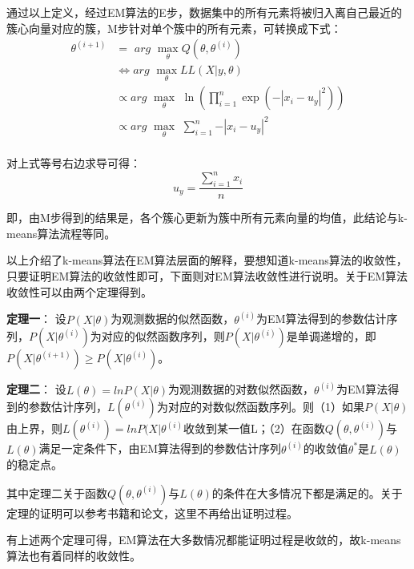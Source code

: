 通过以上定义，经过EM算法的E步，数据集中的所有元素将被归入离自己最近的簇心向量对应的簇，M步针对单个簇中的所有元素，可转换成下式：
$$\begin{aligned}
	\theta ^{\left( i+1 \right)}&=\,\,arg\,\,\underset{\theta}{\max}Q\left( \theta ,\theta ^{\left( i \right)} \right)\\
	&\Leftrightarrow arg\,\,\underset{\theta}{\max}LL\left( X|y,\theta \right)\\
	&\propto arg\,\,\underset{\theta}{\max}\,\,\ln \left( \prod_{i=1}^n{\exp \left( -|x_i-u_y|^2 \right)} \right)\\
	&\propto arg\,\,\underset{\theta}{\max}\,\,\sum_{i=1}^n{-|x_i-u_y|^2}\\
\end{aligned}$$

对上式等号右边求导可得：
$$u_y=\frac{\sum_{i=1}^n{x_i}}{n}$$

即，由M步得到的结果是，各个簇心更新为簇中所有元素向量的均值，此结论与k-means算法流程等同。

以上介绍了k-means算法在EM算法层面的解释，要想知道k-means算法的收敛性，只要证明EM算法的收敛性即可，下面则对EM算法收敛性进行说明。关于EM算法收敛性可以由两个定理得到。

\textbf{定理一}： 设$P(X|\theta)$为观测数据的似然函数，$\theta^{(i)}$为EM算法得到的参数估计序列，$P(X|\theta^{(i)})$为对应的似然函数序列，则$P(X|\theta^{(i)})$是单调递增的，即$P\left( X|\theta ^{\left( i+1 \right)} \right) \geqslant P\left( X|\theta ^{\left( i \right)} \right) $。

\textbf{定理二}： 设$L(\theta)=lnP(X|\theta)$为观测数据的对数似然函数，$\theta^{(i)}$为EM算法得到的参数估计序列，$L(\theta^{(i)})$为对应的对数似然函数序列。则（1）如果$P(X|\theta)$由上界，则$L(\theta^{(i)})=lnP(X|\theta^{(i)}$收敛到某一值L；（2）在函数$Q(\theta,\theta^{(i)})$与$L(\theta)$满足一定条件下，由EM算法得到的参数估计序列$\theta^{(i)}$的收敛值$\theta^{*}$是$L(\theta)$的稳定点。

其中定理二关于函数$Q(\theta,\theta^{(i)})$与$L(\theta)$的条件在大多情况下都是满足的。关于定理的证明可以参考书籍\cite{李航2012统计学习方法}和论文\cite{neal1998view}，这里不再给出证明过程。

有上述两个定理可得，EM算法在大多数情况都能证明过程是收敛的，故k-means算法也有着同样的收敛性。
